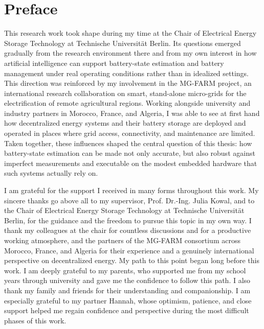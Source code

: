 \documentclass[
    a4paper,
    12pt,
    titlepage,
    bibliography=totoc,
    twoside=on,
    parskip=false,
    numbers=noenddot,
    cleardoublepage=empty,
    DIV=12,
    BCOR=12.0mm,
    headheight=36pt,
    headings=openright
]{scrreprt}
\begin{document}
\cleardoublepage
\chapter*{Preface}
This research work took shape during my time at the Chair of Electrical Energy Storage Technology at Technische Universit\"at Berlin. Its questions emerged gradually from the research environment there and from my own interest in how artificial intelligence can support battery-state estimation and battery management under real operating conditions rather than in idealized settings. This direction was reinforced by my involvement in the MG-FARM project, an international research collaboration on smart, stand-alone micro-grids for the electrification of remote agricultural regions. Working alongside university and industry partners in Morocco, France, and Algeria, I was able to see at first hand how decentralized energy systems and their battery storage are deployed and operated in places where grid access, connectivity, and maintenance are limited. Taken together, these influences shaped the central question of this thesis: how battery-state estimation can be made not only accurate, but also robust against imperfect measurements and executable on the modest embedded hardware that such systems actually rely on.

I am grateful for the support I received in many forms throughout this work. My sincere thanks go above all to my supervisor, Prof. Dr.-Ing. Julia Kowal, and to the Chair of Electrical Energy Storage Technology at Technische Universit\"at Berlin, for the guidance and the freedom to pursue this topic in my own way. I thank my colleagues at the chair for countless discussions and for a productive working atmosphere, and the partners of the MG-FARM consortium across Morocco, France, and Algeria for their experience and a genuinely international perspective on decentralized energy. My path to this point began long before this work. I am deeply grateful to my parents, who supported me from my school years through university and gave me the confidence to follow this path. I also thank my family and friends for their understanding and companionship. I am especially grateful to my partner Hannah, whose optimism, patience, and close support helped me regain confidence and perspective during the most difficult phases of this work.
\end{document}
